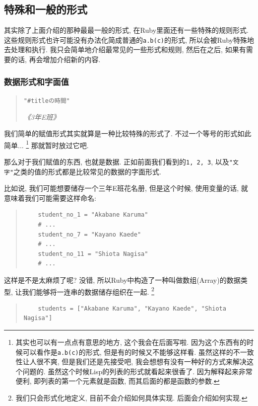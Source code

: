 \subsection{特殊和一般的形式}
其实除了上面介绍的那种最最一般的形式, 在Ruby里面还有一些特殊的规则形式. 这些规则形式也许可能没有办法化简成普通的\texttt{a.b(c)}的形式, 所以会被Ruby特殊地去处理和执行. 我只会简单地介绍最常见的一些形式和规则, 然后在之后, 如果有需要的话, 再会增加介绍新的内容. 

\subsubsection*{数据形式和字面值}
\begin{quotation}
  \texttt{"#{title}の時間"}

  \emph{《3年E班》}
\end{quotation}

我们简单的赋值形式其实就算是一种比较特殊的形式了. 不过一个等号的形式如此简单... \footnote{其实也可以有一点点有意思的地方, 这个我会在后面写啦. 因为这个东西有的时候可以看作是\texttt{a.b(c)}的形式, 但是有的时候又不能够这样看. 虽然这样的不一致性让人很不爽, 但是我们还是先接受吧, 我会想想有没有一种好的方式来解决这个问题的. 虽然这个时候Lisp的列表的形式就看起来很香了. 因为解释起来非常便利, 即列表的第一个元素就是函数, 而其后面的都是函数的参数. } 那就暂时放过它吧. 

那么对于我们赋值的东西, 也就是数据. 正如前面我们看到的\texttt{1, 2, 3}, 以及\texttt{"文字"}之类的值的形式都是比较常见的数据的字面形式. 

比如说, 我们可能想要储存一个三年E班花名册, 但是这个时候, 使用变量的话, 就意味着我们可能需要这样命名: 

\begin{quotation}
  \begin{verbatim}
    student_no_1 = "Akabane Karuma"
    # ...
    student_no_7 = "Kayano Kaede"
    # ...
    student_no_11 = "Shiota Nagisa"
    # ...
  \end{verbatim}
\end{quotation}

这样是不是太麻烦了呢? 没错, 所以Ruby中构造了一种叫做数组(Array)的数据类型, 让我们能够将一连串的数据储存组织在一起. \footnote{我们只会形式化地定义, 目前不会介绍如何具体实现. 后面会介绍如何实现. }

\begin{quotation}
  \begin{verbatim}
    students = ["Akabane Karuma", "Kayano Kaede", "Shiota Nagisa"]
  \end{verbatim}
\end{quotation}

